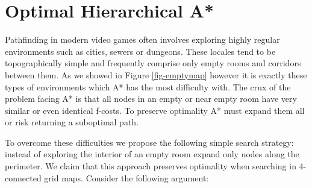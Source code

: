 \section{Optimal Hierarchical A*}
Pathfinding in modern video games often involves exploring highly regular 
\label{algorithm}
environments such as cities, sewers or dungeons.
These locales tend to be topographically simple and frequently comprise only
empty rooms and corridors between them.
As we showed in Figure \ref{fig-emptymap} however it is exactly these 
types of environments which A* has the most difficulty with.
The crux of the problem facing A* is that all nodes in an empty or near 
empty room have very similar or even identical f-costs.
To preserve optimality A* must expand them all or risk returning a suboptimal path.
\par
To overcome these difficulties we propose the following simple search strategy:
instead of exploring the interior of an empty room expand only nodes along the
perimeter. We claim that this approach preserves optimality when searching in 
4-connected grid maps. 
Consider the following argument:

